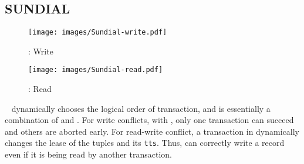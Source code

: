 \subsection{SUNDIAL}

\begin{figure}[t]
    \begin{minipage}{.49\linewidth}
    \centering
    \texttt{[image: images/Sundial-write.pdf]}
    \vspace{-10mm}
    \caption{\sundial: Write}
    \label{fig:sundial-write}
    \end{minipage}
    \begin{minipage}{.49\linewidth}
    \centering
    \texttt{[image: images/Sundial-read.pdf]}
    \vspace{-10mm}
    \caption{\sundial: Read}
    \label{fig:sundial-read}
    \end{minipage}
    \vspace{-8mm}
\end{figure}




\sundial~\cite{yu2018sundial} dynamically chooses
the logical order of transaction, and is essentially
a combination of \waitdie and \occ. 
For write conflicts, with \waitdie, 
only one transaction can succeed and others 
are aborted early.
For read-write conflict, a transaction in \sundial
dynamically changes the lease of the tuples 
and its \texttt{tts}. 
Thus, \sundial can correctly write a record even if it is being read by another transaction.


